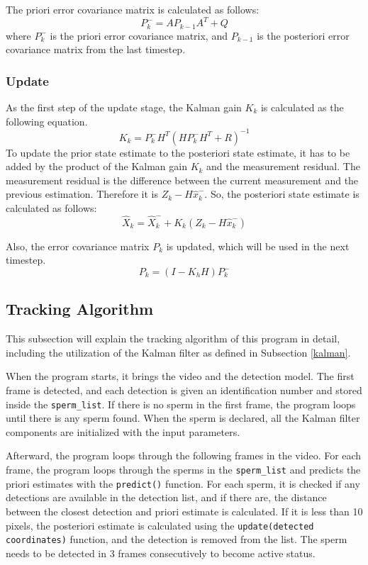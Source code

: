 The priori error covariance matrix is calculated as follows:
\begin{equation}
    \label{prioricov}
    P^-_k = AP_{k-1}A^T + Q
\end{equation}
where \(P^-_k\) is the priori error covariance matrix, and \(P_{k-1}\) is the posteriori error covariance matrix from the last timestep.

\subsubsection{Update}
As the first step of the update stage, the Kalman gain \(K_k\) is calculated as the following equation.
\begin{equation}
    K_k=P^-_k H^T (HP^-_kH^T+R)^{-1}
\end{equation}
To update the prior state estimate to the posteriori state estimate, it has to be added by the product of the Kalman gain \(K_k\) and the measurement residual. The measurement residual is the difference between the current measurement and the previous estimation. Therefore it is \(Z_k - H\hat{x}^-_k\). So, the posteriori state estimate is calculated as follows: 
\begin{equation}
    \hat{X}_k = \hat{X}_k^- + K_k(Z_k - H\hat{x}^-_k)
\end{equation}

Also, the error covariance matrix \(P_k\) is updated, which will be used in the next timestep. 
\begin{equation}
    P_k = (I-K_h H)P^-_k
\end{equation}

\subsection{Tracking Algorithm}
This subsection will explain the tracking algorithm of this program in detail, including the utilization of the Kalman filter as defined in Subsection \ref{kalman}.

When the program starts, it brings the video and the detection model. The first frame is detected, and each detection is given an identification number and stored inside the \verb|sperm_list|. If there is no sperm in the first frame, the program loops until there is any sperm found. When the sperm is declared, all the Kalman filter components are initialized with the input parameters. 

Afterward, the program loops through the following frames in the video. For each frame, the program loops through the sperms in the \verb|sperm_list| and predicts the priori estimates with the \verb|predict()| function. For each sperm, it is checked if any detections are available in the detection list, and if there are, the distance between the closest detection and priori estimate is calculated. If it is less than 10 pixels, the posteriori estimate is calculated using the \verb|update(detected coordinates)| function, and the detection is removed from the list. The sperm needs to be detected in 3 frames consecutively to become active status. 

